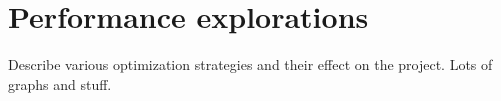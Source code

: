 \section{Performance explorations}
Describe various optimization strategies and their effect on the project. Lots of graphs and stuff.